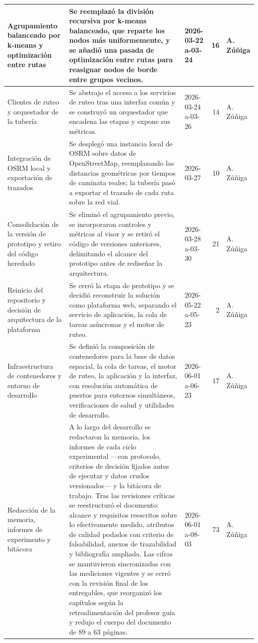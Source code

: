 \begin{xltabular}{\linewidth}{|p{3cm}|X|p{3cm}|r|l|}
\hline
Agrupamiento balanceado por k-means y optimización entre rutas & Se reemplazó la división recursiva por k-means balanceado, que reparte los nodos más uniformemente, y se añadió una pasada de optimización entre rutas para reasignar nodos de borde entre grupos vecinos. & 2026-03-22 a-03-24 & 16 & A. Zúñiga \\
\hline
Clientes de ruteo y orquestador de la tubería & Se abstrajo el acceso a los servicios de ruteo tras una interfaz común y se construyó un orquestador que encadena las etapas y expone sus métricas. & 2026-03-24 a-03-26 & 14 & A. Zúñiga \\
\hline
Integración de OSRM local y exportación de trazados & Se desplegó una instancia local de OSRM sobre datos de OpenStreetMap, reemplazando las distancias geométricas por tiempos de caminata reales; la tubería pasó a exportar el trazado de cada ruta sobre la red vial. & 2026-03-27 & 10 & A. Zúñiga \\
\hline
Consolidación de la versión de prototipo y retiro del código heredado & Se eliminó el agrupamiento previo, se incorporaron controles y métricas al visor y se retiró el código de versiones anteriores, delimitando el alcance del prototipo antes de rediseñar la arquitectura. & 2026-03-28 a-03-30 & 21 & A. Zúñiga \\
\hline
Reinicio del repositorio y decisión de arquitectura de la plataforma & Se cerró la etapa de prototipo y se decidió reconstruir la solución como plataforma web, separando el servicio de aplicación, la cola de tareas asíncronas y el motor de ruteo. & 2026-05-22 a-05-23 & 2 & A. Zúñiga \\
\hline
Infraestructura de contenedores y entorno de desarrollo & Se definió la composición de contenedores para la base de datos espacial, la cola de tareas, el motor de ruteo, la aplicación y la interfaz, con resolución automática de puertos para entornos simultáneos, verificaciones de salud y utilidades de desarrollo. & 2026-06-01 a-06-23 & 17 & A. Zúñiga \\
\hline
Redacción de la memoria, informes de experimento y bitácora & A lo largo del desarrollo se redactaron la memoria, los informes de cada ciclo experimental ---con protocolo, criterios de decisión fijados antes de ejecutar y datos crudos versionados--- y la bitácora de trabajo. Tras las revisiones críticas se reestructuró el documento: alcance y requisitos reescritos sobre lo efectivamente medido, atributos de calidad podados con criterio de falsabilidad, anexos de trazabilidad y bibliografía ampliada. Las cifras se mantuvieron sincronizadas con las mediciones vigentes y se cerró con la revisión final de los entregables, que reorganizó los capítulos según la retroalimentación del profesor guía y redujo el cuerpo del documento de 89 a 63 páginas. & 2026-06-01 a-08-03 & 73 & A. Zúñiga \\

\end{xltabular}
